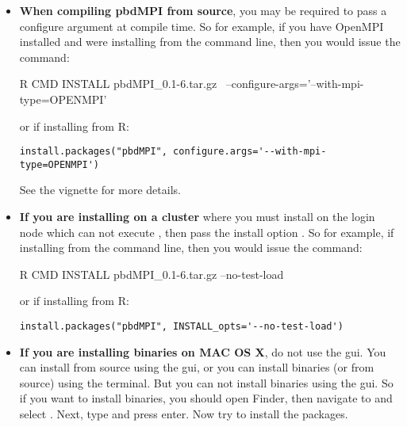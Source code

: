 \begin{itemize}
  \item \textbf{When compiling pbdMPI from source}, you may be required to pass a configure argument at compile time.  So for example, if you have OpenMPI installed and were installing from the command line, then you would issue the command:
\begin{Code}
R CMD INSTALL pbdMPI_0.1-6.tar.gz \
        --configure-args='--with-mpi-type=OPENMPI'
\end{Code}
  or if installing from R:
  \begin{lstlisting}[language=rr]
install.packages("pbdMPI", configure.args='--with-mpi-type=OPENMPI')
\end{lstlisting}
  See the  vignette for more details.

  
  \item \textbf{If you are installing on a cluster} where you must install on the login node which can not execute , then pass the install option .    So for example, if installing from the command line, then you would issue the command:
\begin{Code}
R CMD INSTALL pbdMPI_0.1-6.tar.gz --no-test-load
\end{Code}
  or if installing from R:
  \begin{lstlisting}[language=rr]
install.packages("pbdMPI", INSTALL_opts='--no-test-load')
\end{lstlisting}

  
  \item \textbf{If you are installing binaries on MAC OS X}, do not use the gui.  You can install from source using the gui, or you can install binaries (or from source) using the terminal.  But you can not install binaries using the gui.  So if you want to install binaries,  you should open Finder, then navigate to  and select .  Next, type  and press enter.  Now try to install the packages.

\end{itemize}

